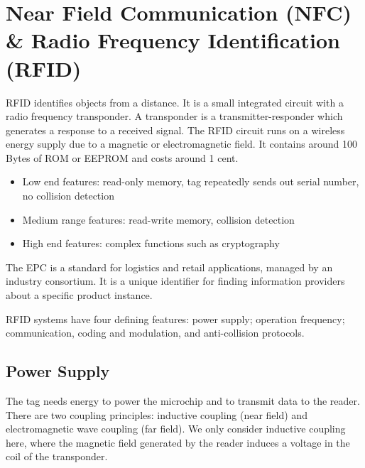 \section[NFC \& RFID]{Near Field Communication (NFC) \& Radio Frequency Identification (RFID)}
\begin{mytitle}[RFID] RFID identifies objects from a distance. It is a small integrated circuit with a radio frequency transponder. A transponder is a transmitter-responder which generates a response to a received signal. The RFID circuit runs on a wireless energy supply due to a magnetic or electromagnetic field. It contains around 100 Bytes of ROM or EEPROM and costs around 1 cent.
\end{mytitle}
\begin{mytitle}\hfill
\begin{itemize}
    \item Low end features: read-only memory, tag repeatedly sends out serial number, no collision detection
    \item Medium range features: read-write memory, collision detection
    \item High end features: complex functions such as cryptography
\end{itemize}
\end{mytitle}
\begin{mytitle} The EPC is a standard for logistics and retail applications, managed by an industry consortium. It is a unique identifier for finding information providers about a specific product instance.
\end{mytitle}
\begin{mytitle} RFID systems have four defining features: power supply; operation frequency; communication, coding and modulation, and anti-collision protocols.
\end{mytitle}

\subsection{Power Supply}
\begin{mytitle} The tag needs energy to power the microchip and to transmit data to the reader. There are two coupling principles: inductive coupling (near field) and electromagnetic wave coupling (far field). We only consider inductive coupling here, where the magnetic field generated by the reader induces a voltage in the coil of the transponder.
\end{mytitle}

